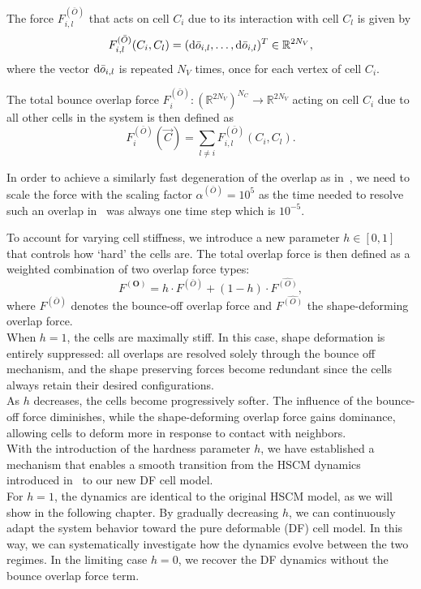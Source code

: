 \begin{definition}
	The force $F^{(\bar{O})}_{i,l}$ that acts on cell $C_i$ due to its interaction with cell $C_l$ is given by
	\[
	F^{(\bar{O})}_{i,l}(C_i, C_l) =  (\mathrm{d} \bar{o}_{i,l}, \ldots, \mathrm{d} \bar{o}_{i,l})^T \in \mathbb{R}^{2N_V},
	\]
	where the vector $\mathrm{d} \bar{o}_{i,l}$ is repeated $N_V$ times, once for each vertex of cell $C_i$.

	The total bounce overlap force $F^{(\bar{O})}_i: (\mathbb{R}^{2N_V})^{N_C} \rightarrow \mathbb{R}^{2N_V}$ acting on cell $C_i$ due to all other cells in the system is then defined as
	\[
	F^{(\bar{O})}_i(\vec{C}) = \sum\limits_{l \neq i} F^{(\bar{O})}_{i,l}(C_i, C_l).
	\]

\end{definition}
In order to achieve a similarly fast degeneration of the overlap as in~\cite{Bruna2012}, we need to scale the force with the scaling factor 
\(
\alpha^{(\bar{O})} = 10^5
\)
as the time needed to resolve such an overlap in~\cite{Bruna2012} was always one time step which is $10^{-5}$. 

To account for varying cell stiffness, we introduce a new parameter $h \in [0, 1]$ that controls how `hard' the cells are. 
The total overlap force is then defined as a weighted combination of two overlap force types:
\[
F^{(\mathbf{O})} = h \cdot F^{(\bar{O})} + (1 - h) \cdot F^{\hat{(O)}},
\]
where $F^{(\bar{O})}$ denotes the bounce-off overlap force and $F^{\hat{(O)}}$ the shape-deforming overlap force.\\
When $h = 1$, the cells are maximally stiff. 
In this case, shape deformation is entirely suppressed: all overlaps are resolved solely through the bounce off mechanism, and the shape preserving forces become redundant since the cells always retain their desired configurations. \\
As $h$ decreases, the cells become progressively softer. 
The influence of the bounce-off force diminishes, while the shape-deforming overlap force gains dominance, allowing cells to deform more in response to contact with neighbors. \\
With the introduction of the hardness parameter $h$, we have established a mechanism that enables a smooth transition from the HSCM dynamics introduced in~\cite{Bruna2012} to our new DF cell model. \\
For $h = 1$, the dynamics are identical to the original HSCM model, as we will show in the following chapter. 
By gradually decreasing $h$, we can continuously adapt the system behavior toward the pure deformable (DF) cell model. 
In this way, we can systematically investigate how the dynamics evolve between the two regimes. 
In the limiting case $h = 0$, we recover the DF dynamics without the bounce overlap force term.


